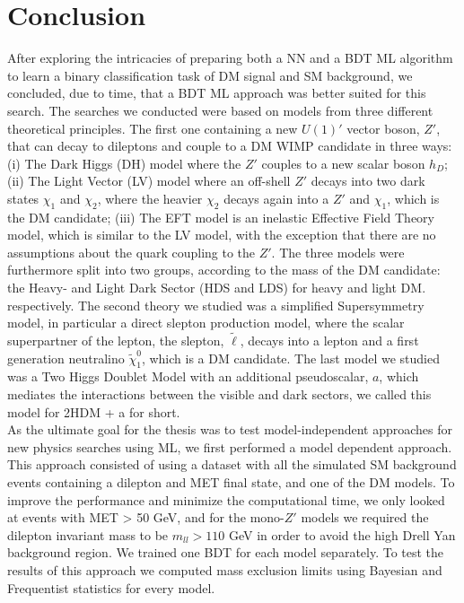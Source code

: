 \documentclass[12pt, a4paper]{book}
\begin{document}
\section{Conclusion}
After exploring the intricacies of preparing both a NN and a BDT ML algorithm to learn a binary classification task of DM signal and SM background, we concluded, due to time, that a BDT ML approach was 
better suited for this search. The searches we conducted were based on models from three different theoretical principles. The first one containing a new $U(1)'$ vector boson, $Z'$, that can decay to dileptons and couple to a DM WIMP candidate in three ways: 
(i) The Dark Higgs (DH) model where the $Z'$ couples to a new scalar boson $h_D$; (ii) The Light Vector (LV) model where an off-shell $Z'$ decays into two dark states $\chi_1$ and $\chi_2$, where the heavier $\chi_2$ decays again into a $Z'$ and $\chi_1$, which is the DM candidate;
(iii) The EFT model is an inelastic Effective Field Theory model, which is similar to the LV model, with the exception that there are no assumptions about the quark coupling to the $Z'$. The three models were furthermore 
split into two groups, according to the mass of the DM candidate: the Heavy- and Light Dark Sector (HDS and LDS) for heavy and light DM. respectively. The second theory we studied was a simplified Supersymmetry model, 
in particular a direct slepton production model, where the scalar superpartner of the lepton, the slepton, $\tilde{\ell}$, decays into a lepton and a first generation neutralino $\tilde{\chi}_1^0$, which is a DM candidate. The last model we studied was 
a Two Higgs Doublet Model with an additional pseudoscalar, $a$, which mediates the interactions between the visible and dark sectors, we called this model for 2HDM + a for short.\\
\newpage\noindent As the ultimate goal for the thesis was to test model-independent approaches for new physics searches using ML, we first performed a model dependent approach. This approach consisted of using a dataset 
with all the simulated SM background events containing a dilepton and MET final state, and one of the DM models. To improve the performance and minimize the computational time, we only looked at events with MET > 50 GeV, and for the mono-$Z'$ models we required the dilepton
invariant mass to be $m_{ll}>110$ GeV in order to avoid the high Drell Yan background region. We trained one BDT for each model separately. To test the results of this approach we computed mass exclusion limits using Bayesian and Frequentist statistics for every model.\\
\end{document}
